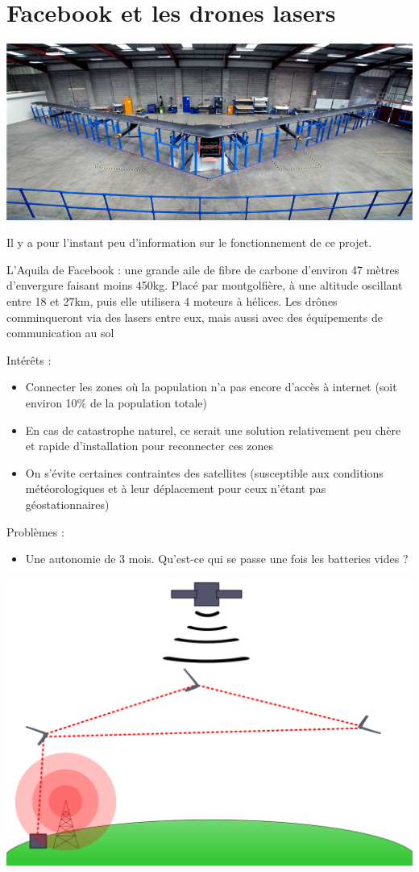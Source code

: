 \documentclass[a4paper,11pt]{report}
\begin{document}
\section{Facebook et les drones lasers}
\begin{flushleft}
\includegraphics[width=\textwidth]{../Images/facebook_aquila.png}
\end{flushleft}
Il y a pour l'instant peu d'information sur le fonctionnement de ce projet.

L'Aquila de Facebook : une grande aile de fibre de carbone d'environ 47 mètres d'envergure faisant moins 450kg. Placé par montgolfière, à une altitude oscillant entre 18 et 27km, puis elle utilisera 4 moteurs à hélices. Les drônes comminqueront via des lasers entre eux, mais aussi avec des équipements de communication au sol

Intérêts :
\begin{itemize}
  \item Connecter les zones où la population n'a pas encore d'accès à internet (soit environ 10\% de la population totale)
  \item En cas de catastrophe naturel, ce serait une solution relativement peu chère et rapide d'installation pour reconnecter ces zones
  \item On s'évite certaines contraintes des satellites (susceptible aux conditions météorologiques et à leur déplacement pour ceux n'étant pas géostationnaires)
\end{itemize}

Problèmes :
\begin{itemize}
  \item Une autonomie de 3 mois. Qu'est-ce qui se passe une fois les batteries vides ?
\end{itemize}
\includegraphics[width=\textwidth]{../Images/schema_aquila.png}
\end{document}
